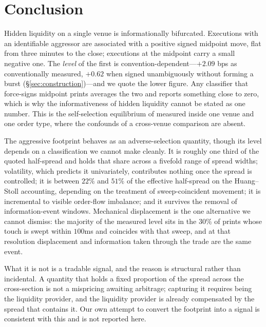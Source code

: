 \documentclass[11pt]{article}
\begin{document}
\section{Conclusion}
\label{sec:conclusion}

Hidden liquidity on a single venue is informationally bifurcated. Executions with an
identifiable aggressor are associated with a positive signed midpoint move, flat from three
minutes to the close; executions at the midpoint carry a small negative one. The \emph{level}
of the first is convention-dependent---$+2.09$ bps as conventionally measured, $+0.62$ when
signed unambiguously without forming a burst (\S\ref{sec:construction})---and we quote the
lower figure. Any classifier that
force-signs midpoint prints averages the two and reports something close to zero, which is
why the informativeness of hidden liquidity cannot be stated as one number. This is the
self-selection equilibrium of \citet{zhu2014} measured inside one venue and one order type,
where the confounds of a cross-venue comparison are absent.

The aggressive footprint behaves as an adverse-selection quantity, though its level depends
on a classification we cannot make cleanly. It is roughly one third
of the quoted half-spread and holds that share across a fivefold range of spread widths;
volatility, which predicts it univariately, contributes nothing once the spread is
controlled; it is between $22\%$ and $51\%$ of the effective half-spread on the Huang--Stoll
accounting, depending on the treatment of sweep-coincident movement; it is
incremental to visible order-flow imbalance; and it survives the removal of
information-event windows. Mechanical displacement is the one alternative we cannot dismiss:
the majority of the measured level sits in the $30\%$ of prints whose touch is swept within
$100$ms and coincides with that sweep, and at that resolution displacement and
information taken through the trade are the same event.

What it is not is a tradable signal, and the reason is structural rather than incidental. A
quantity that holds a fixed proportion of the spread across the cross-section is not a
mispricing awaiting arbitrage; capturing it requires being the liquidity provider, and the
liquidity provider is already compensated by the spread that contains it. Our own attempt to
convert the footprint into a signal is consistent with this and is not reported here.
\end{document}
